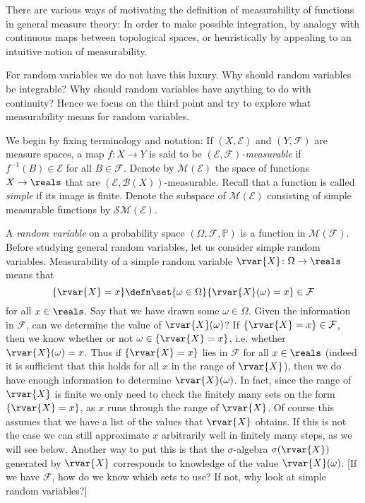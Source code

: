 \documentclass[article, a4paper, 11pt, oneside]{memoir}
\numberwithin{equation}{chapter}
\newcommand{\preim}{^{-1}}
\newcommand{\calB}{\mathcal{B}}
\newcommand{\calE}{\mathcal{E}}
\newcommand{\calF}{\mathcal{F}}
\newcommand{\borel}[1]{\calB(#1)}
\renewcommand{\P}{\mathbb{P}}
\begin{document}
\newcommand{\meas}[1]{\mathcal{M}(#1)}
\newcommand{\simplemeas}[1]{\mathcal{S\!M}(#1)}

There are various ways of motivating the definition of measurability of functions in general measure theory: In order to make possible integration, by analogy with continuous maps between topological spaces, or heuristically by appealing to an intuitive notion of measurability.

For random variables we do not have this luxury. Why should random variables be integrable? Why should random variables have anything to do with continuity? Hence we focus on the third point and try to explore what measurability means for random variables.

We begin by fixing terminology and notation: If $(X,\calE)$ and $(Y,\calF)$ are measure spaces, a map $f \colon X \to Y$ is said to be \emph{$(\calE,\calF)$-measurable} if $f\preim(B) \in \calE$ for all $B \in \calF$. Denote by $\meas{\calE}$ the space of functions $X \to \reals$ that are $(\calE,\borel{X})$-measurable. Recall that a function is called \emph{simple} if its image is finite. Denote the subspace of $\meas{\calE}$ consisting of simple measurable functions by $\simplemeas{\calE}$.

A \emph{random variable} on a probability space $(\Omega,\calF,\P)$ is a function in $\meas{\calF}$. Before studying general random variables, let us consider simple random variables. Measurability of a simple random variable $\rvar{X} \colon \Omega \to \reals$ means that
%
\begin{equation*}
    \{ \rvar{X} = x \}
        \defn \set{\omega \in \Omega}{\rvar{X}(\omega) = x}
        \in \calF
\end{equation*}
%
for all $x \in \reals$. Say that we have drawn some $\omega \in \Omega$. Given the information in $\calF$, can we determine the value of $\rvar{X}(\omega)$? If $\{\rvar{X} = x\} \in \calF$, then we know whether or not $\omega \in \{\rvar{X} = x\}$, i.e. whether $\rvar{X}(\omega) = x$. Thus if $\{\rvar{X} = x\}$ lies in $\calF$ for all $x \in \reals$ (indeed it is sufficient that this holds for all $x$ in the range of $\rvar{X}$), then we do have enough information to determine $\rvar{X}(\omega)$. In fact, since the range of $\rvar{X}$ is finite we only need to check the finitely many sets on the form $\{\rvar{X} = x\}$, as $x$ runs through the range of $\rvar{X}$. Of course this assumes that we have a list of the values that $\rvar{X}$ obtains. If this is not the case we can still approximate $x$ arbitrarily well in finitely many steps, as we will see below. Another way to put this is that the $\sigma$-algebra $\sigma(\rvar{X})$ generated by $\rvar{X}$ corresponds to knowledge of the value $\rvar{X}(\omega)$. [If we have $\calF$, how do we know which sets to use? If not, why look at simple random variables?]
\end{document}

